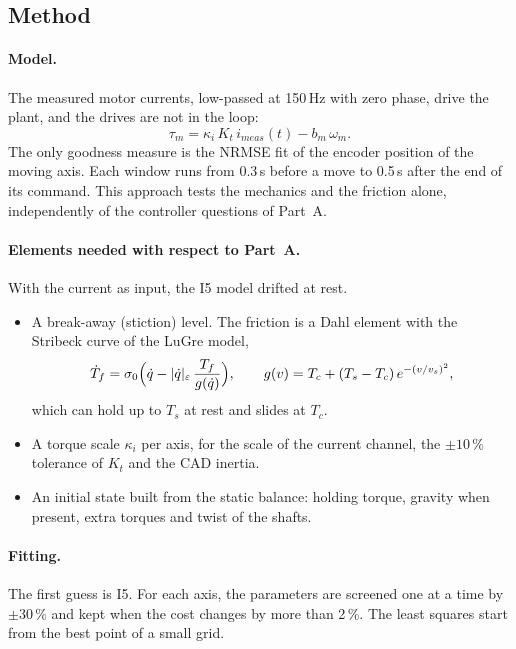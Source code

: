 \documentclass[10pt,a4paper]{article}
\numberwithin{equation}{section}
\begin{document}
\subsection{Method}
\paragraph{Model.} The measured motor currents, low-passed at 150\,Hz with zero phase, drive the plant, and the drives are not in the loop:
\begin{equation}
\tau_m=\kappa_i\,K_t\,i_{meas}(t)-b_m\,\omega_m .
\end{equation}
The only goodness measure is the NRMSE fit of the encoder position of the moving axis. Each window runs from 0.3\,s before a move to 0.5\,s after the end of its command. This approach tests the mechanics and the friction alone, independently of the controller questions of Part~A.

\paragraph{Elements needed with respect to Part~A.} With the current as input, the I5 model drifted at rest.
\begin{itemize}
\item A break-away (stiction) level. The friction is a Dahl element with the Stribeck curve of the LuGre model,
\begin{equation}
\dot T_f=\sigma_0\Bigl(\dot q-|\dot q|_\varepsilon\,\frac{T_f}{g(\dot q)}\Bigr),\qquad g(v)=T_c+(T_s-T_c)\,e^{-(v/v_s)^2},
\end{equation}
which can hold up to $T_s$ at rest and slides at $T_c$.
\item A torque scale $\kappa_i$ per axis, for the scale of the current channel, the $\pm10$\,\% tolerance of $K_t$ and the CAD inertia.
\item An initial state built from the static balance: holding torque, gravity when present, extra torques and twist of the shafts.
\end{itemize}

\paragraph{Fitting.} The first guess is I5. For each axis, the parameters are screened one at a time by $\pm30$\,\% and kept when the cost changes by more than 2\,\%. The least squares start from the best point of a small grid.
\end{document}
